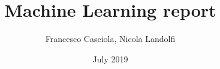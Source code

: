 \documentclass[a4paper,12pt]{book}
\begin{document}
\author{Francesco Casciola, Nicola Landolfi}
\title{Machine Learning report}
\date{July 2019}

\frontmatter
\maketitle
\tableofcontents

\mainmatter



\backmatter
{}

\end{document}
